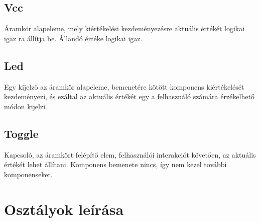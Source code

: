 \subsection{\bf Vcc}
Áramkör alapeleme, mely kiértékelési kezdeményezésre aktuális értékét logikai igaz ra állítja be. Állandó értéke logikai igaz.

\subsection{\bf Led}
Egy kijelző az áramkör alapeleme, bemenetére kötött komponens kiértékelését kezdeményezi, és ezáltal az aktuális értékét egy a felhasználó számára érzékelhető módon kijelzi.

\subsection{\bf Toggle}
Kapcsoló, az áramkört felépítő elem, felhasználói interakciót követően, az aktuális értékét lehet állítani. Komponens bemenete nincs, így nem kezel további komponenseket.

\section{Osztályok leírása}







